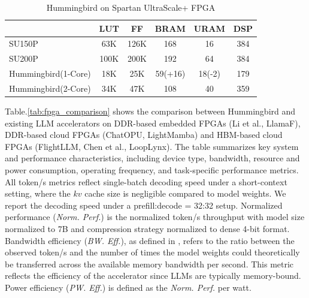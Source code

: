 \documentclass[conference]{IEEEtran}
\begin{document}
  \begin{table}
    \centering
    \caption{Hummingbird on Spartan UltraScale+ FPGA}
    \begin{tabular}{lccccc}
    \toprule
      & \textbf{LUT} & \textbf{FF} & \textbf{BRAM} & \textbf{URAM} & \textbf{DSP} \\
    \midrule
    SU150P           & 63K  &  126K  &  168 & 16 & 384  \\
    SU200P           & 100K &  200K  &  192 & 64 & 384  \\
    Hummingbird(1-Core)      & 18K  &  25K   &  59(+16)  & 18(-2) & 179  \\
    Hummingbird(2-Core)      & 34K  &  47K   &  108 & 40 & 359  \\
    \bottomrule
    \end{tabular}
    \label{tab:Spartan}
    \end{table}

Table.\ref{tab:fpga_comparison} shows the comparison between Hummingbird and existing LLM accelerators on DDR-based embedded FPGAs (Li et al.\cite{li2025pushing}, LlamaF\cite{xu2024llamaf}), DDR-based cloud FPGAs (ChatOPU\cite{chatgptcite}, LightMamba\cite{wei2025lightmamba}) and HBM-based cloud FPGAs (FlightLLM\cite{zeng2024flightllm}, Chen et al.\cite{chen2024understanding}, LoopLynx\cite{zheng2025looplynx}).
The table summarizes key system and performance characteristics, including device type, bandwidth, resource and power consumption, operating frequency, and task-specific performance metrics.
All token/s metrics reflect single-batch decoding speed under a short-context setting, where the $kv$ cache size is negligible compared to model weights.
We report the decoding speed under a prefill:decode = 32:32 setup.
Normalized performance (\textit{Norm. Perf.}) is the normalized token/s throughput with model size normalized to 7B and compression strategy normalized to dense 4-bit format.
Bandwidth efficiency (\textit{BW. Eff.}), as defined in \cite{agarwal2023llm}, refers to the ratio between the observed token/s and the number of times the model weights could theoretically be transferred across the available memory bandwidth per second. This metric reflects the efficiency of the accelerator since LLMs are typically memory-bound.
Power efficiency (\textit{PW. Eff.}) is defined as the \textit{Norm. Perf.} per watt.
\end{document}
